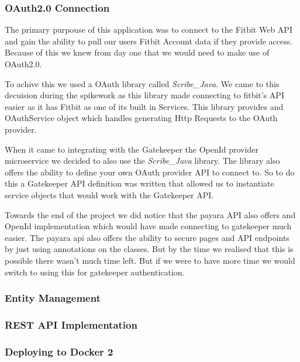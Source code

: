 \subsubsection{OAuth2.0 Connection}

\par
The primary purpouse of this application was to connect to the Fitbit Web API and gain the ability to pull our users Fitbit Account data if they provide access. Because of this we knew from day one that we would need to make use of OAuth2.0.
\par
To achive this we used a OAuth library called \textit{Scribe_Java}\cite{ScribeJava}. We came to this decuision during the spikework as this library made connecting to fitbit's API easier as it has Fitbit as one of its built in Services. This library provides and OAuthService object which handles generating Http Requests to the OAuth provider.
\par
When it came to integrating with the Gatekeeper the OpenId provider microservice we decided to also use the \textit{Scribe_Java}\cite{ScribeJava} library. The library also offers the ability to define your own OAuth provider API to connect to. So to do this a Gatekeeper API definition was written that allowed us to instantiate service objects that would work with the Gatekeeper API.
\par
Towards the end of the project we did notice that the payara API also offers and OpenId implementation which would have made connecting to gatekeeper much easier. The payara api also offers the ability to secure pages and API endpoints by just using annotations on the classes. But by the time we realised that this is possible there wasn't much time left. But if we were to have more time we would switch to using this for gatekeeper authentication.

\subsubsection{Entity Management}

\par
 

\subsubsection{REST API Implementation}

\par


\subsubsection{Deploying to Docker 2}


